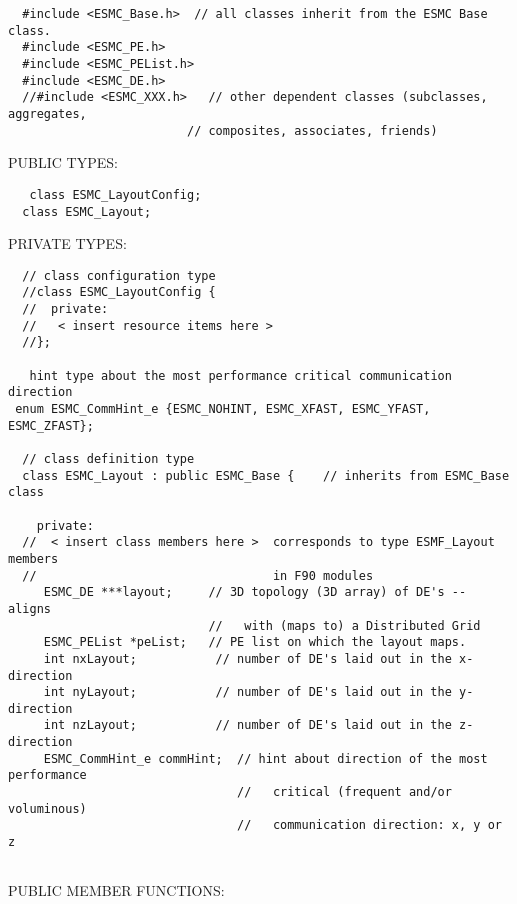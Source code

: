 \begin{verbatim}  #include <ESMC_Base.h>  // all classes inherit from the ESMC Base class.
  #include <ESMC_PE.h>  
  #include <ESMC_PEList.h>  
  #include <ESMC_DE.h>  
  //#include <ESMC_XXX.h>   // other dependent classes (subclasses, aggregates,
                         // composites, associates, friends)
 \end{verbatim}{\sf PUBLIC TYPES:}
\begin{verbatim}   class ESMC_LayoutConfig;
  class ESMC_Layout;
 \end{verbatim}{\sf PRIVATE TYPES:}
\begin{verbatim} 
  // class configuration type
  //class ESMC_LayoutConfig {
  //  private:
  //   < insert resource items here >
  //};
 
   hint type about the most performance critical communication direction
 enum ESMC_CommHint_e {ESMC_NOHINT, ESMC_XFAST, ESMC_YFAST, ESMC_ZFAST};
 
  // class definition type
  class ESMC_Layout : public ESMC_Base {    // inherits from ESMC_Base class
 
    private:
  //  < insert class members here >  corresponds to type ESMF_Layout members
  //                                 in F90 modules
     ESMC_DE ***layout;     // 3D topology (3D array) of DE's -- aligns
                            //   with (maps to) a Distributed Grid
     ESMC_PEList *peList;   // PE list on which the layout maps. 
     int nxLayout;           // number of DE's laid out in the x-direction
     int nyLayout;           // number of DE's laid out in the y-direction
     int nzLayout;           // number of DE's laid out in the z-direction
     ESMC_CommHint_e commHint;  // hint about direction of the most performance
                                //   critical (frequent and/or voluminous)
                                //   communication direction: x, y or z
                             
 \end{verbatim}{\sf PUBLIC MEMBER FUNCTIONS:}
